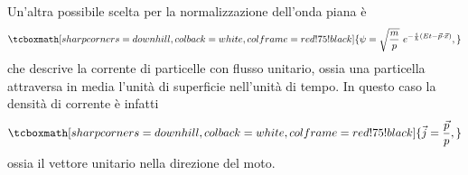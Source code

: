 \documentclass[a4paper,12pt,oneside]{book}
\begin{document}
Un'altra possibile scelta per la normalizzazione dell'onda piana è
	\begin{equation}
		\tcboxmath[sharp corners=downhill, colback=white, colframe=red!75!black]{	
			\psi  = \sqrt{\frac{m}{p}}\ e^{-\frac{i}{\hbar} (Et - \vec{p}\cdot \vec{x})},
			}
	\end{equation}
che descrive la corrente di particelle con flusso unitario, ossia una particella attraversa in media l'unità di superficie nell'unità di tempo. In questo caso la densità di corrente è infatti
	\begin{equation}
		\tcboxmath[sharp corners=downhill, colback=white, colframe=red!75!black]{
			\vec{j}=  \frac{\vec{p}}{p},
			}
	\end{equation}
ossia il vettore unitario nella direzione del moto.
\end{document}
